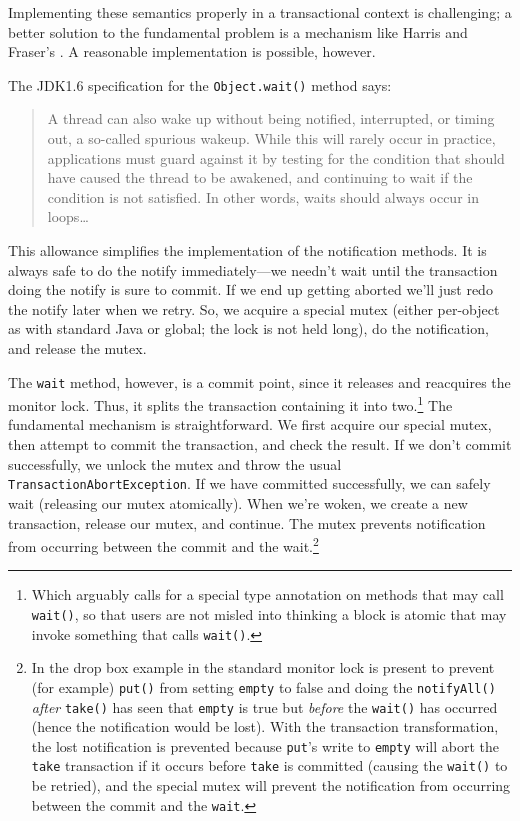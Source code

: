 Implementing these semantics properly in a transactional context is
challenging; a better solution to the fundamental problem is a
mechanism like Harris and Fraser's 
\cite{HarrisFr03}.  A reasonable implementation is possible, however.

The JDK1.6 specification for the \texttt{Object.wait()} method says:
\begin{quote}
A thread can also wake up without being notified, interrupted, or
timing out, a so-called spurious wakeup. While this will rarely occur
in practice, applications must guard against it by testing for the
condition that should have caused the thread to be awakened, and
continuing to wait if the condition is not satisfied. In other words,
waits should always occur in loops\ldots
\end{quote}
This allowance simplifies the implementation of the notification
methods.  It is always safe to do the notify immediately---we
needn't wait until the transaction doing the notify is sure to
commit. If we end up getting aborted we'll just redo the notify later when we
retry.  So, we acquire a special mutex (either per-object as with
standard Java or global; the lock is not held long), do the
notification, and release the mutex.

The \texttt{wait} method, however, is a commit point, since it
releases and reacquires the monitor lock.  Thus, it splits the
transaction containing it into two.\footnote{Which arguably calls for
a special type annotation on methods that may call \texttt{wait()},
so that users are not misled into thinking a block is atomic that may
invoke something that calls \texttt{wait()}.}  The fundamental
mechanism is straightforward.  We first acquire our special mutex,
then attempt to commit the transaction, and check the result.  If we
don't commit successfully, we unlock the mutex and throw the usual
\texttt{TransactionAbortException}.  If we have committed
successfully, we can safely wait (releasing our mutex atomically).
When we're woken, we create a new transaction, release our mutex, and
continue.  The mutex prevents notification from occurring between the
commit and the wait.\footnote{In the drop box example in
 the standard monitor lock is present to prevent
(for example) \texttt{put()} from setting \texttt{empty} to false and
doing the \texttt{notifyAll()} \textit{after} \texttt{take()} has seen
that \texttt{empty} is true but \textit{before} the \texttt{wait()}
has occurred (hence the notification would be lost).  With the
transaction transformation, the lost notification is prevented because
\texttt{put}'s write to \texttt{empty} will abort the \texttt{take}
transaction if it occurs before \texttt{take} is committed (causing
the \texttt{wait()} to be retried), and the special mutex will prevent
the notification from occurring between the commit and the
\texttt{wait}.}

